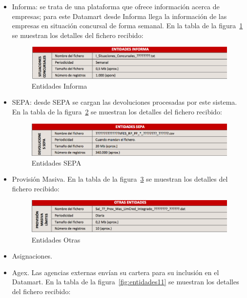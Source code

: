 \documentclass[a4paper, 12pt]{book}
\begin{document}
\begin{itemize}
	\item Informa: se trata de una plataforma que ofrece información acerca de empresas; para este Datamart desde Informa llega la información de las empresas en situación concursal de forma semanal. En la tabla de la figura~\ref{fig:entidades8} se muestran los detalles del fichero recibido:

	\begin{figure}
	  \centering
	  \includegraphics[width=14cm, keepaspectratio]{img/entidades8}
	  \caption{Entidades Informa}
	  \label{fig:entidades8}
	\end{figure}
	
	\item SEPA: desde SEPA se cargan las devoluciones procesadas por este sistema. En la tabla de la figura~\ref{fig:entidades9} se muestran los detalles del fichero recibido:

	\begin{figure}
	  \centering
	  \includegraphics[width=14cm, keepaspectratio]{img/entidades9}
	  \caption{Entidades SEPA}
	  \label{fig:entidades9}
	\end{figure}
	
	\item Provisión Masiva. En la tabla de la figura~\ref{fig:entidades10} se muestran los detalles del fichero recibido:

	\begin{figure}
	  \centering
	  \includegraphics[width=14cm, keepaspectratio]{img/entidades10}
	  \caption{Entidades Otras}
	  \label{fig:entidades10}
	\end{figure}
	
	\item Asignaciones.
	
	\item Agex. Las agencias externas envían su cartera para su inclusión en el Datamart. En la tabla de la figura~\ref{fig:entidades11} se muestran los detalles del fichero recibido:


\end{itemize}
\end{document}
